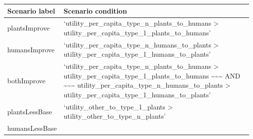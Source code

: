 \documentclass[
]{book}
\begin{document}
\begin{longtable}[]{@{}ll@{}}
\toprule
\begin{minipage}[b]{0.33\columnwidth}\raggedright
\textbf{Scenario label}\strut
\end{minipage} & \begin{minipage}[b]{0.62\columnwidth}\raggedright
\textbf{Scenario condition}\strut
\end{minipage}\tabularnewline
\midrule
\endhead
\begin{minipage}[t]{0.33\columnwidth}\raggedright
plantsImprove\strut
\end{minipage} & \begin{minipage}[t]{0.62\columnwidth}\raggedright
`utility\_per\_capita\_type\_n\_plants\_to\_humans \textgreater{} utility\_per\_capita\_type\_1\_plants\_to\_humans'\strut
\end{minipage}\tabularnewline
\begin{minipage}[t]{0.33\columnwidth}\raggedright
humansImprove\strut
\end{minipage} & \begin{minipage}[t]{0.62\columnwidth}\raggedright
`utility\_per\_capita\_type\_n\_humans\_to\_plants \textgreater{} utility\_per\_capita\_type\_1\_humans\_to\_plants'\strut
\end{minipage}\tabularnewline
\begin{minipage}[t]{0.33\columnwidth}\raggedright
bothImprove\strut
\end{minipage} & \begin{minipage}[t]{0.62\columnwidth}\raggedright
`utility\_per\_capita\_type\_n\_plants\_to\_humans \textgreater{} utility\_per\_capita\_type\_1\_plants\_to\_humans \textasciitilde\textasciitilde\textasciitilde{} AND \textasciitilde\textasciitilde\textasciitilde{} utility\_per\_capita\_type\_n\_humans\_to\_plants \textgreater{} utility\_per\_capita\_type\_1\_humans\_to\_plants'\strut
\end{minipage}\tabularnewline
\begin{minipage}[t]{0.33\columnwidth}\raggedright
plantsLessBase\strut
\end{minipage} & \begin{minipage}[t]{0.62\columnwidth}\raggedright
`utility\_other\_to\_type\_1\_plants \textgreater{} utility\_other\_to\_type\_n\_plants'\strut
\end{minipage}\tabularnewline
\begin{minipage}[t]{0.33\columnwidth}\raggedright
humansLessBase\strut
\end{minipage} & \begin{minipage}[t]{0.62\columnwidth}\raggedright

\end{minipage}
\end{longtable}
\end{document}
